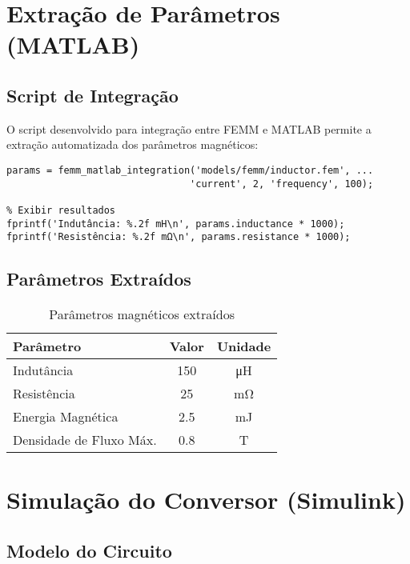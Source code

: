 \documentclass[12pt, a4paper]{article}
\begin{document}
\section{Extração de Parâmetros (MATLAB)}

\subsection{Script de Integração}

O script desenvolvido para integração entre FEMM e MATLAB permite a extração automatizada dos parâmetros magnéticos:

\begin{lstlisting}[style=matlab, caption=Exemplo de extração de parâmetros]
% Carregar modelo FEMM
params = femm_matlab_integration('models/femm/inductor.fem', ...
                                'current', 2, 'frequency', 100);

% Exibir resultados
fprintf('Indutância: %.2f mH\n', params.inductance * 1000);
fprintf('Resistência: %.2f mΩ\n', params.resistance * 1000);
\end{lstlisting}

\subsection{Parâmetros Extraídos}

\begin{table}[H]
    \centering
    \caption{Parâmetros magnéticos extraídos}
    \label{tab:parametros}
    \begin{tabular}{@{}lcc@{}}
        \toprule
        Parâmetro & Valor & Unidade \\
        \midrule
        Indutância & \num{150} & \si{\micro\henry} \\
        Resistência & \num{25} & \si{\milli\ohm} \\
        Energia Magnética & \num{2.5} & \si{\milli\joule} \\
        Densidade de Fluxo Máx. & \num{0.8} & \si{\tesla} \\
        \bottomrule
    \end{tabular}
\end{table}

\section{Simulação do Conversor (Simulink)}

\subsection{Modelo do Circuito}
\end{document}

